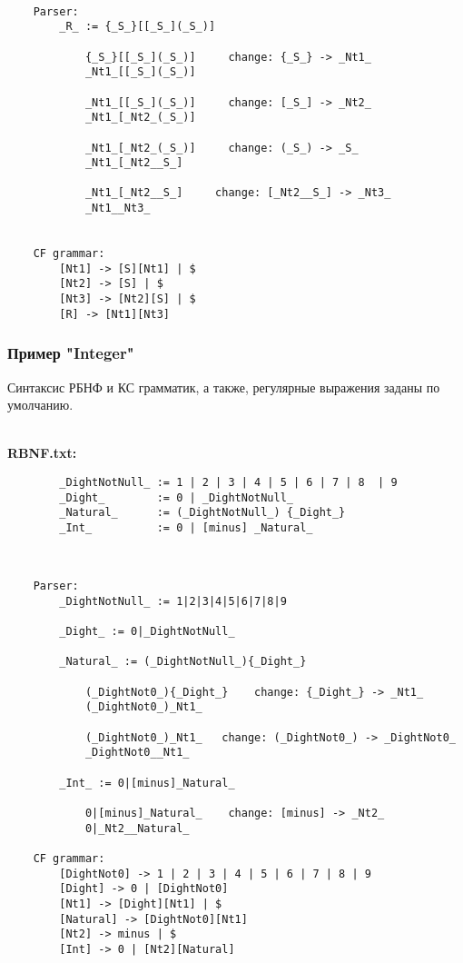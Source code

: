 \documentclass[12pt]{article}
\begin{document}
    \hfill \\  %
    \begin{lstlisting}
    Parser:
        _R_ := {_S_}[[_S_](_S_)]

            {_S_}[[_S_](_S_)]     change: {_S_} -> _Nt1_
            _Nt1_[[_S_](_S_)]

            _Nt1_[[_S_](_S_)]     change: [_S_] -> _Nt2_
            _Nt1_[_Nt2_(_S_)]

            _Nt1_[_Nt2_(_S_)]     change: (_S_) -> _S_
            _Nt1_[_Nt2__S_]

            _Nt1_[_Nt2__S_]     change: [_Nt2__S_] -> _Nt3_
            _Nt1__Nt3_


    CF grammar:
        [Nt1] -> [S][Nt1] | $
        [Nt2] -> [S] | $
        [Nt3] -> [Nt2][S] | $
        [R] -> [Nt1][Nt3]
    \end{lstlisting}

    \clearpage


    \subsubsection*{\large Пример "Integer"}
    Синтаксис РБНФ и КС грамматик, а также, регулярные выражения заданы по умолчанию.

    \hfill \\
    {\bfseries RBNF.txt:}
    \begin{lstlisting}
        _DightNotNull_ := 1 | 2 | 3 | 4 | 5 | 6 | 7 | 8  | 9
        _Dight_        := 0 | _DightNotNull_
        _Natural_      := (_DightNotNull_) {_Dight_}
        _Int_          := 0 | [minus] _Natural_
    \end{lstlisting}

    \hfill \\
    \begin{lstlisting}
    Parser:
        _DightNotNull_ := 1|2|3|4|5|6|7|8|9

        _Dight_ := 0|_DightNotNull_

        _Natural_ := (_DightNotNull_){_Dight_}

            (_DightNot0_){_Dight_}    change: {_Dight_} -> _Nt1_
            (_DightNot0_)_Nt1_

            (_DightNot0_)_Nt1_   change: (_DightNot0_) -> _DightNot0_
            _DightNot0__Nt1_

        _Int_ := 0|[minus]_Natural_

            0|[minus]_Natural_    change: [minus] -> _Nt2_
            0|_Nt2__Natural_

    CF grammar:
        [DightNot0] -> 1 | 2 | 3 | 4 | 5 | 6 | 7 | 8 | 9
        [Dight] -> 0 | [DightNot0]
        [Nt1] -> [Dight][Nt1] | $
        [Natural] -> [DightNot0][Nt1]
        [Nt2] -> minus | $
        [Int] -> 0 | [Nt2][Natural]
    \end{lstlisting}
\end{document}
